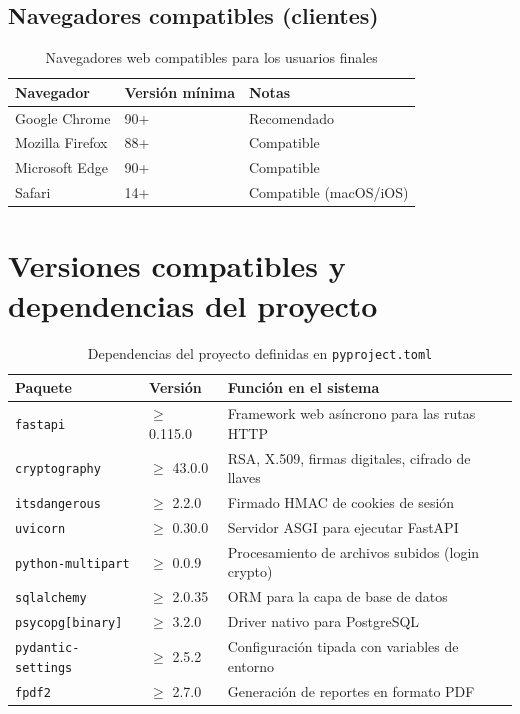 \documentclass[10pt,letterpaper]{report}
\begin{document}
\subsection{Navegadores compatibles (clientes)}

\begin{table}[H]
  \centering
  \caption{Navegadores web compatibles para los usuarios finales}
  \label{tab:navegadores}
  \begin{tabularx}{\textwidth}{l l X}
    \toprule
    \textbf{Navegador} & \textbf{Versión mínima} & \textbf{Notas} \\
    \midrule
    Google Chrome      & 90+   & Recomendado \\
    Mozilla Firefox    & 88+   & Compatible \\
    Microsoft Edge     & 90+   & Compatible \\
    Safari             & 14+   & Compatible (macOS/iOS) \\
    \bottomrule
  \end{tabularx}
\end{table}

\section{Versiones compatibles y dependencias del proyecto}

\begin{table}[H]
  \centering
  \caption{Dependencias del proyecto definidas en \texttt{pyproject.toml}}
  \label{tab:dependencias}
  \begin{tabularx}{\textwidth}{l l X}
    \toprule
    \textbf{Paquete} & \textbf{Versión} & \textbf{Función en el sistema} \\
    \midrule
    \texttt{fastapi}           & $\geq$ 0.115.0 & Framework web asíncrono para las rutas HTTP \\
    \texttt{cryptography}      & $\geq$ 43.0.0  & RSA, X.509, firmas digitales, cifrado de llaves \\
    \texttt{itsdangerous}      & $\geq$ 2.2.0   & Firmado HMAC de cookies de sesión \\
    \texttt{uvicorn}           & $\geq$ 0.30.0  & Servidor ASGI para ejecutar FastAPI \\
    \texttt{python-multipart}  & $\geq$ 0.0.9   & Procesamiento de archivos subidos (login crypto) \\
    \texttt{sqlalchemy}        & $\geq$ 2.0.35  & ORM para la capa de base de datos \\
    \texttt{psycopg[binary]}   & $\geq$ 3.2.0   & Driver nativo para PostgreSQL \\
    \texttt{pydantic-settings}  & $\geq$ 2.5.2   & Configuración tipada con variables de entorno \\
    \texttt{fpdf2}             & $\geq$ 2.7.0   & Generación de reportes en formato PDF \\
    \bottomrule
  \end{tabularx}
\end{table}
\end{document}
